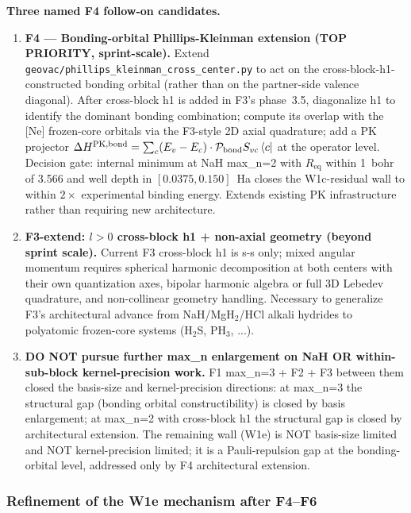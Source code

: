 \documentclass[aps,pra,twocolumn,superscriptaddress,longbibliography]{revtex4-2}
\begin{document}
\textbf{Three named F4 follow-on candidates.}
\begin{enumerate}\setlength\itemsep{0pt}
\item \textbf{F4 — Bonding-orbital Phillips-Kleinman extension (TOP PRIORITY,
  sprint-scale).} Extend
  \texttt{geovac/phillips\_kleinman\_cross\_center.py} to act on the
  cross-block-h1-constructed bonding orbital (rather than on the
  partner-side valence diagonal). After cross-block h1 is added in F3's
  phase~3.5, diagonalize h1 to identify the dominant bonding combination;
  compute its overlap with the [Ne] frozen-core orbitals via the
  F3-style 2D axial quadrature; add a PK projector
  $\Delta H^\text{PK,bond} = \sum_c (E_v - E_c)\cdot\mathcal{P}_\text{bond}
  S_{vc}\bra{c}$ at the operator level. Decision gate: internal minimum
  at NaH max\_n=2 with $R_\text{eq}$ within 1~bohr of 3.566 and well
  depth in $[0.0375, 0.150]$~Ha closes the W1c-residual wall to within
  $2\times$ experimental binding energy. Extends existing PK infrastructure
  rather than requiring new architecture.
\item \textbf{F3-extend: $l>0$ cross-block h1 + non-axial geometry
  (beyond sprint scale).} Current F3 cross-block h1 is s-s only; mixed angular
  momentum requires spherical harmonic decomposition at both centers with
  their own quantization axes, bipolar harmonic algebra or full 3D
  Lebedev quadrature, and non-collinear geometry handling. Necessary to
  generalize F3's architectural advance from NaH/MgH$_2$/HCl alkali
  hydrides to polyatomic frozen-core systems (H$_2$S, PH$_3$, ...).
\item \textbf{DO NOT pursue further max\_n enlargement on NaH OR within-sub-block
  kernel-precision work.} F1 max\_n=3 + F2 + F3 between them closed the
  basis-size and kernel-precision directions: at max\_n=3 the structural
  gap (bonding orbital constructibility) is closed by basis enlargement;
  at max\_n=2 with cross-block h1 the structural gap is closed by
  architectural extension. The remaining wall (W1e) is NOT basis-size
  limited and NOT kernel-precision limited; it is a Pauli-repulsion gap at
  the bonding-orbital level, addressed only by F4 architectural extension.
\end{enumerate}

\subsubsection{Refinement of the W1e mechanism after F4--F6}
\label{sec:w1e_refinement_f4_f6}
\end{document}

